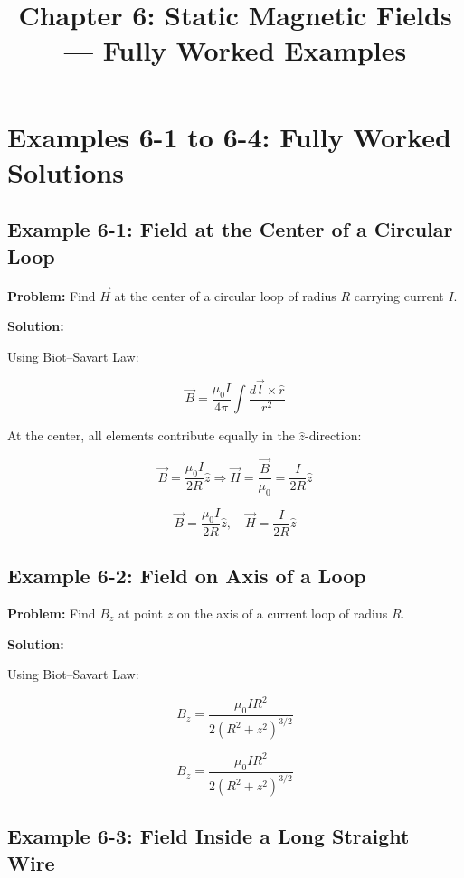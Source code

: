 \documentclass[12pt]{article}
\title{Chapter 6: Static Magnetic Fields — Fully Worked Examples}
\author{}
\date{}
\begin{document}
\maketitle
\tableofcontents
\newpage

\section*{Examples 6-1 to 6-4: Fully Worked Solutions}

\subsection*{Example 6-1: Field at the Center of a Circular Loop}

\textbf{Problem:}  
Find \( \vec{H} \) at the center of a circular loop of radius \( R \) carrying current \( I \).

\textbf{Solution:}

Using Biot–Savart Law:

\[
\vec{B} = \frac{\mu_0 I}{4\pi} \int \frac{d\vec{l} \times \hat{r}}{r^2}
\]

At the center, all elements contribute equally in the \( \hat{z} \)-direction:

\[
\vec{B} = \frac{\mu_0 I}{2R} \hat{z}
\Rightarrow \vec{H} = \frac{\vec{B}}{\mu_0} = \frac{I}{2R} \hat{z}
\]

\begin{tcolorbox}
\[
\boxed{\vec{B} = \frac{\mu_0 I}{2R} \hat{z}}, \quad
\boxed{\vec{H} = \frac{I}{2R} \hat{z}}
\]
\end{tcolorbox}

\subsection*{Example 6-2: Field on Axis of a Loop}

\textbf{Problem:}  
Find \( B_z \) at point \( z \) on the axis of a current loop of radius \( R \).

\textbf{Solution:}

Using Biot–Savart Law:

\[
B_z = \frac{\mu_0 I R^2}{2 (R^2 + z^2)^{3/2}}
\]

\begin{tcolorbox}
\[
\boxed{B_z = \frac{\mu_0 I R^2}{2 (R^2 + z^2)^{3/2}}}
\]
\end{tcolorbox}

\subsection*{Example 6-3: Field Inside a Long Straight Wire}
\end{document}

